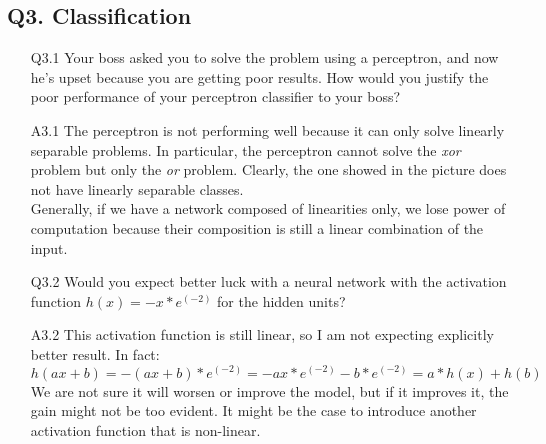 \documentclass[11pt]{scrartcl}
\begin{document}
\subsection*{Q3. Classification}
\begin{itemize}
\item[Q3.1] Your boss asked you to solve the problem using a perceptron, and now he's upset because you are getting poor results. How would you justify the poor performance of your perceptron classifier to your boss?
\item[A3.1] The perceptron is not performing well because it can only solve linearly separable problems. In particular, the perceptron cannot solve the \textit{xor} problem but only the \textit{or} problem. Clearly, the one showed in the picture does not have linearly separable classes. \\
Generally, if we have a network composed of linearities only, we lose power of computation because their composition is still a linear combination of the input.

\item[Q3.2] Would you expect better luck with a neural network with the activation function $h(x) = - x * e^{(-2)}$ for the hidden units?
\item[A3.2] This activation function is still linear, so I am not expecting explicitly better result. In fact:
$$h(ax+b) = -(ax + b)*e^{(-2)} = -ax*e^{(-2)} - b*e^{(-2)} = a*h(x) + h(b)$$
We are not sure it will worsen or improve the model, but if it improves it, the gain might not be too evident. It might be the case to introduce another activation function that is non-linear.


\end{itemize}
\end{document}
